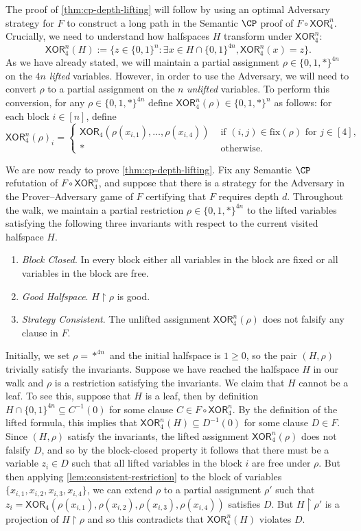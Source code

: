 \documentclass[11pt]{article}
\numberwithin{equation}{section}
\theoremstyle{definition}
\theoremstyle{plain}
\newcommand{\set}[1]{\{ #1 \}}
\renewcommand{\restriction}{\!\!\upharpoonright}
\newcommand{\fix}{\ensuremath{\mathrm{fix}}}
\newcommand{\boolcube}{\ensuremath{\{0,1\}}}
\newcommand{\XOR}{\ensuremath{\mathsf{XOR}}}
\renewcommand{\restriction}{\!\ensuremath{\upharpoonright}\!}
\begin{document}
The proof of \autoref{thm:cp-depth-lifting} will follow by using an optimal Adversary strategy for $F$ to construct a long path in the Semantic $\CP$ proof of $F \circ \XOR_4^n$.
Crucially, we need to understand how halfspaces $H$ transform under $\XOR_4^n$:
\[ \XOR_4^n(H):= \{z \in \{0,1\}^n : \exists x \in H \cap \set{0,1}^{4n}, \XOR^n_4(x) = z\}. \]
As we have already stated, we will maintain a partial assignment $\rho \in \{0,1,*\}^{4n}$ on the $4n$ \emph{lifted} variables.
However, in order to use the Adversary, we will need to convert $\rho$ to a partial assignment on the $n$ \emph{unlifted} variables.
To perform this conversion, for any $\rho \in \set{0,1,*}^{4n}$ define $\XOR_4^n(\rho) \in \{0,1,*\}^n$ as follows: for each block $i \in [n]$, define \[ \XOR^n_4(\rho)_i  = \begin{cases}
		\XOR_4(\rho(x_{i,1}),\ldots, \rho(x_{i, 4})) &\mbox{ if $(i,j) \in \fix(\rho)$ for $j \in [4]$}, \\
 		* &\mbox{ otherwise}.
 \end{cases}
 \]

We are now ready to prove \autoref{thm:cp-depth-lifting}.
Fix any Semantic $\CP$ refutation of $F \circ \XOR_4^n$, and suppose that there is a strategy for the Adversary in the Prover--Adversary game of $F$ certifying that $F$ requires depth $d$.
Throughout the walk, we maintain a partial restriction $\rho \in \set{0,1,*}^{4n}$ to the lifted variables satisfying the following three invariants with respect to the current visited halfspace $H$. 
\begin{enumerate}
	\item[--] \emph{Block Closed}. In every block either all variables in the block are fixed or all variables in the block are free.
	\item[--] \emph{Good Halfspace}. $H \restriction \rho$ is good.
	\item[--] \emph{Strategy Consistent}. The unlifted assignment $\XOR_4^n(\rho)$ does not falsify any clause in $F$.
\end{enumerate}
%
%
%
%
%
%
%
%
Initially, we set $\rho = *^{4n}$ and the initial halfspace is $1 \geq 0$, so the pair $(H, \rho)$ trivially satisfy the invariants.
Suppose we have reached the halfspace $H$ in our walk and $\rho$ is a restriction satisfying the invariants.
We claim that $H$ cannot be a leaf.
To see this, suppose that $H$ is a leaf, then by definition $H \cap \boolcube^{4n} \subseteq C^{-1}(0)$ for some clause $C \in F \circ \XOR^n_4$. 
By the definition of the lifted formula, this implies that $\XOR^n_4(H) \subseteq D^{-1}(0)$ for some clause $D \in F$.
Since $(H, \rho)$ satisfy the invariants, the lifted assignment $\XOR_4^n(\rho)$ does not falsify $D$, and so by the block-closed property it follows that there must be a variable $z_i \in D$ such that all lifted variables in the block $i$ are free under $\rho$.
But then applying \autoref{lem:consistent-restriction} to the block of variables $\set{x_{i,1}, x_{i,2}, x_{i,3}, x_{i,4}}$, we can extend $\rho$ to a partial assignment $\rho'$ such that $z_i = \XOR_4(\rho(x_{i,1}), \rho(x_{i,2}), \rho(x_{i,3}), \rho(x_{i,4}))$ satisfies $D$.
But $H \restriction \rho'$ is a projection of $H \restriction \rho$ and so this contradicts that $\XOR^n_4(H)$ violates $D$.
\end{document}
